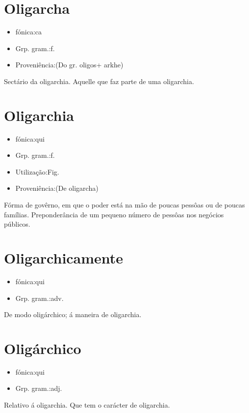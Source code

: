 \section{Oligarcha}
\begin{itemize}
\item {fónica:ca}
\end{itemize}
\begin{itemize}
\item {Grp. gram.:f.}
\end{itemize}
\begin{itemize}
\item {Proveniência:(Do gr. \textunderscore oligos\textunderscore  + \textunderscore arkhe\textunderscore )}
\end{itemize}
Sectário da oligarchia.
Aquelle que faz parte de uma oligarchia.
\section{Oligarchia}
\begin{itemize}
\item {fónica:qui}
\end{itemize}
\begin{itemize}
\item {Grp. gram.:f.}
\end{itemize}
\begin{itemize}
\item {Utilização:Fig.}
\end{itemize}
\begin{itemize}
\item {Proveniência:(De \textunderscore oligarcha\textunderscore )}
\end{itemize}
Fórma de govêrno, em que o poder está na mão de poucas pessôas ou de poucas famílias.
Preponderância de um pequeno número de pessôas nos negócios públicos.
\section{Oligarchicamente}
\begin{itemize}
\item {fónica:qui}
\end{itemize}
\begin{itemize}
\item {Grp. gram.:adv.}
\end{itemize}
De modo oligárchico; á maneira de oligarchia.
\section{Oligárchico}
\begin{itemize}
\item {fónica:qui}
\end{itemize}
\begin{itemize}
\item {Grp. gram.:adj.}
\end{itemize}
Relativo á oligarchia.
Que tem o carácter de oligarchia.
